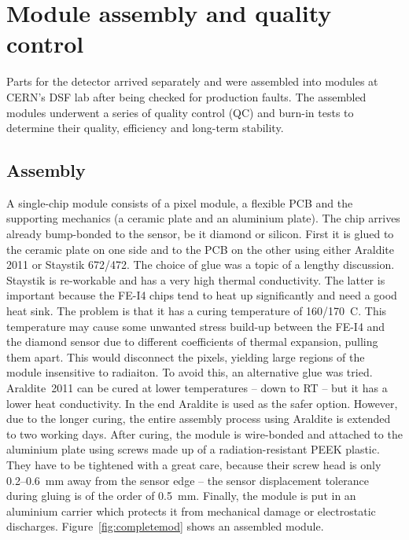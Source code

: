 \section{Module assembly and quality control}
Parts for the detector arrived separately and were assembled into modules at CERN's DSF lab after being checked for production faults. The assembled modules underwent a series of quality control (QC) and burn-in tests to determine their quality, efficiency and long-term stability.
\subsection{Assembly}
A single-chip module consists of a pixel module, a flexible PCB and the supporting mechanics (a ceramic plate and an aluminium plate). The chip arrives already bump-bonded to the sensor, be it diamond or silicon. First it is glued to the ceramic plate on one side and to the PCB on the other using either Araldite 2011 or Staystik 672/472. The choice of glue was a topic of a lengthy discussion. Staystik is re-workable and has a very high thermal conductivity. The latter is important because the FE-I4 chips tend to heat up significantly and need a good heat sink. The problem is that it has a curing temperature of 160/170~\textdegree C. This temperature may cause some unwanted stress build-up between the FE-I4 and the diamond sensor due to different coefficients of thermal expansion, pulling them apart. This would disconnect the pixels, yielding large regions of the module insensitive to radiaiton. To avoid this, an alternative glue was tried. Araldite~2011 can be cured at lower temperatures -- down to RT -- but it has a lower heat conductivity. In the end Araldite is used as the safer option. However, due to the longer curing, the entire assembly process using Araldite is extended to two working days. After curing, the module is wire-bonded and attached to the aluminium plate using screws made up of a radiation-resistant PEEK plastic. They have to be tightened with a great care, because their screw head is only 0.2--0.6~mm away from the sensor edge -- the sensor displacement tolerance during gluing is of the order of 0.5~mm. Finally, the module is put in an aluminium carrier which protects it from mechanical damage or electrostatic discharges. Figure~\ref{fig:completemod} shows an assembled module.


